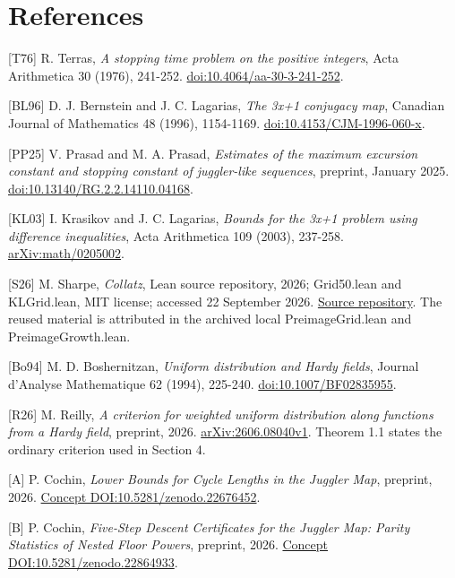 \documentclass[11pt,a4paper]{article}
\begin{document}
\section{References}\label{references}

\begingroup\small

{[}T76{]} R. Terras, \emph{A stopping time problem on the positive
integers}, Acta Arithmetica 30 (1976), 241-252.
\href{https://doi.org/10.4064/aa-30-3-241-252}{doi:10.4064/aa-30-3-241-252}.

{[}BL96{]} D. J. Bernstein and J. C. Lagarias, \emph{The 3x+1 conjugacy
map}, Canadian Journal of Mathematics 48 (1996), 1154-1169.
\href{https://doi.org/10.4153/CJM-1996-060-x}{doi:10.4153/CJM-1996-060-x}.

{[}PP25{]} V. Prasad and M. A. Prasad, \emph{Estimates of the maximum
excursion constant and stopping constant of juggler-like sequences},
preprint, January 2025.
\href{https://doi.org/10.13140/RG.2.2.14110.04168}{doi:10.13140/RG.2.2.14110.04168}.

{[}KL03{]} I. Krasikov and J. C. Lagarias, \emph{Bounds for the 3x+1
problem using difference inequalities}, Acta Arithmetica 109 (2003),
237-258. \href{https://arxiv.org/abs/math/0205002}{arXiv:math/0205002}.

{[}S26{]} M. Sharpe, \emph{Collatz}, Lean source repository, 2026;
Grid50.lean and KLGrid.lean, MIT license; accessed 22 September 2026.
\href{https://github.com/msharpe248/collatz}{Source repository}. The
reused material is attributed in the archived local PreimageGrid.lean
and PreimageGrowth.lean.

{[}Bo94{]} M. D. Boshernitzan, \emph{Uniform distribution and Hardy
fields}, Journal d'Analyse Mathematique 62 (1994), 225-240.
\href{https://doi.org/10.1007/BF02835955}{doi:10.1007/BF02835955}.

{[}R26{]} M. Reilly, \emph{A criterion for weighted uniform distribution
along functions from a Hardy field}, preprint, 2026.
\href{https://arxiv.org/abs/2606.08040v1}{arXiv:2606.08040v1}. Theorem
1.1 states the ordinary criterion used in Section 4.

{[}A{]} P. Cochin, \emph{Lower Bounds for Cycle Lengths in the Juggler
Map}, preprint, 2026.
\href{https://doi.org/10.5281/zenodo.22676452}{Concept
DOI:10.5281/zenodo.22676452}.

{[}B{]} P. Cochin, \emph{Five-Step Descent Certificates for the Juggler
Map: Parity Statistics of Nested Floor Powers}, preprint, 2026.
\href{https://doi.org/10.5281/zenodo.22864933}{Concept
DOI:10.5281/zenodo.22864933}.
\end{document}
